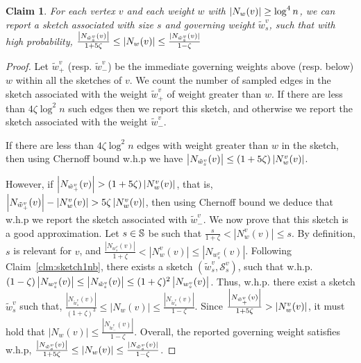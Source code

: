\documentclass{article}
\newtheorem{claim}[theorem]{Claim}
\newcommand{\Sk}{{\mathcal{S}}}
\begin{document}
\begin{claim}\label{clm:sketch1nb2}
For each vertex \(v\) and each weight $w$ with $\left|N_w(v)\right| \geq \log^4 n$, we can report a sketch associated with size $s$ and governing weight $\tilde{w}^v_s$, such that with high probability, 
$\frac{\left|N_{\tilde{w}^v_{s}}(v)\right|}{1+5\zeta} \leq |N_{w}(v)| \leq \frac{|N_{\tilde{w}^v_s}(v)|}{1-\zeta}$
\end{claim}

\begin{proof}
Let $\tilde{w}^v_{+}$ (resp. $\tilde{w}^v_{-}$) be the immediate governing weights above (resp. below) $w$ within all the sketches of $v$. We count the number of sampled edges in the sketch associated with the weight $\tilde{w}^v_{+}$ of weight greater than $w$. If there are less than $4\zeta \log^2 n$ such edges then we report this sketch, and otherwise we report the sketch associated with the weight $\tilde{w}^v_{-}$.

If there are less than  $4\zeta \log^2 n$ edges with weight greater than $w$ in the sketch, then using Chernoff bound w.h.p we have $\left|N_{\tilde{w}^v_{s}}(v)\right| \leq (1+5\zeta) \left|N^v_{w}(v)\right|$.

However, if $\left|N_{\tilde{w}^v_{+}}(v)\right| > (1+5\zeta) \left|N^v_{w}(v)\right|$, that is, $\left|N_{\tilde{w}^v_{+}}(v)\right| - \left|N^v_{w}(v)\right| > 5 \zeta \left|N^v_{w}(v)\right|$, then using Chernoff bound we deduce that w.h.p we report the sketch associated with $\tilde{w}^v_{-}$.
We now prove that this sketch is a good approximation. Let \(s \in \mathbb{S} \) be such that \(\frac{s}{1+\zeta}<|N^v_{w}(v)| \le s\). By definition, $s$ is relevant for $v$, and 
$\frac{|N_{w^v_s}(v)|}{1+\zeta}< |N^v_{w}(v)| \leq |N_{w^v_s}(v)|$. Following Claim~\ref{clm:sketch1nb}, there exists a sketch $(\tilde{w}^v_s, {\Sk}^{v}_s)$, such that w.h.p. \((1-\zeta)\left|N_{w^v_s}(v)\right| \leq \left|N_{\tilde{w}^v_s}(v)\right| \leq (1+\zeta)^2\left|N_{w^v_s}(v)\right|\). Thus, w.h.p. there exist a sketch $\tilde{w}^v_s$ such that, \(\frac{|N_{\tilde{w}^v_s}(v)|}{(1+\zeta)^3} \leq |N_{w}(v)| \leq \frac{|N_{\tilde{w}^v_s}(v)|}{1-\zeta}\). Since $\frac{\left|N_{\tilde{w}^v_{+}}(v)\right|}{1+5\zeta} >  \left|N^v_{w}(v)\right|$, it must hold that $|N_{w}(v)| \leq \frac{|N_{\tilde{w}^v_{-}}(v)|}{1-\zeta}$. 
Overall, the reported governing weight satisfies w.h.p, $\frac{\left|N_{\tilde{w}^v_{s}}(v)\right|}{1+5\zeta} \leq |N_{w}(v)| \leq \frac{|N_{\tilde{w}^v_s}(v)|}{1-\zeta}$.
\end{proof}

\vspace{3mm}
\noindent
\end{document}
